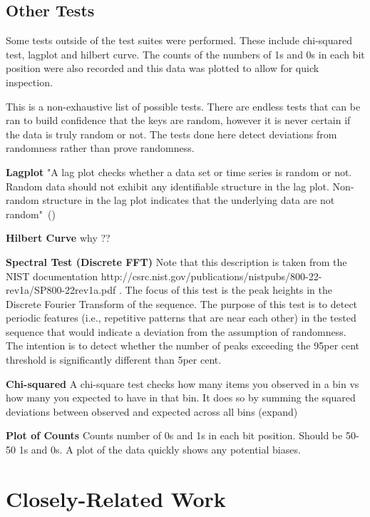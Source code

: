 \subsection{Other Tests}

Some tests outside of the test suites were performed. These include chi-squared test, lagplot and hilbert curve. 
The counts of the numbers of 1s and 0s in each bit position were also recorded and this data was plotted to allow for quick inspection. \par

This is a non-exhaustive list of possible tests. There are endless tests that can be ran to build confidence that the keys are random, however it is never certain if the data is truly random or not. The tests done here detect deviations from randomness rather than prove randomness. \par

\textbf{Lagplot} "A lag plot checks whether a data set or time series is random or not. Random data should not exhibit any identifiable structure in the lag plot. Non-random structure in the lag plot indicates that the underlying data are not random"~(\cite{lagplot})\par
\textbf{Hilbert Curve} why ??\par
\textbf{Spectral Test (Discrete FFT)} Note that this description is taken from the NIST documentation http://csrc.nist.gov/publications/nistpubs/800-22-rev1a/SP800-22rev1a.pdf . The focus of this test is the peak heights in the Discrete Fourier Transform of the sequence. The purpose of this test is to detect periodic features (i.e., repetitive patterns that are near each other) in the tested sequence that would indicate a deviation from the assumption of randomness. The intention is to detect whether the number of peaks exceeding the 95per cent threshold is significantly different than 5per cent.\par
\textbf{Chi-squared} A chi-square test checks how many items you observed in a bin vs how many you expected to have in that bin. It does so by summing the squared deviations between observed and expected across all bins (expand)\par
\textbf{Plot of Counts} Counts number of 0s and 1s in each bit position. Should be 50-50 1s and 0s. A plot of the data quickly shows any potential biases.\par


\section{Closely-Related Work}
